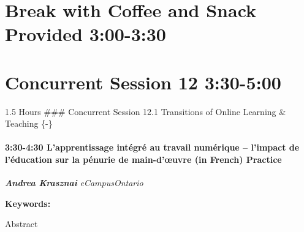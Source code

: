 \documentclass[
]{book}
\begin{document}
\hypertarget{break-with-coffee-and-snack-provided-300-330-1}{%
\section{Break with Coffee and Snack Provided \textbar{} 3:00-3:30}\label{break-with-coffee-and-snack-provided-300-330-1}}

\hypertarget{concurrent-session-12-330-500}{%
\section*{Concurrent Session 12 \textbar{} 3:30-5:00}\label{concurrent-session-12-330-500}}

1.5 Hours
\#\#\# Concurrent Session 12.1 \textbar{} Transitions of Online Learning \& Teaching \{-\}

\begin{session}
\hypertarget{lapprentissage-intuxe9gruxe9-au-travail-numuxe9rique-limpact-de-luxe9ducation-sur-la-puxe9nurie-de-main-dux153uvre-in-french-practice}{%
\paragraph*{\texorpdfstring{3:30-4:30 \textbar{} \textbf{L'apprentissage
intégré au travail numérique -- l'impact de l'éducation sur la pénurie
de main-d'œuvre (in French)} \textbar{}
Practice}{3:30-4:30 \textbar{} L'apprentissage intégré au travail numérique -- l'impact de l'éducation sur la pénurie de main-d'œuvre (in French) \textbar{} Practice}}\label{lapprentissage-intuxe9gruxe9-au-travail-numuxe9rique-limpact-de-luxe9ducation-sur-la-puxe9nurie-de-main-dux153uvre-in-french-practice}}

\textbf{\emph{Andrea Krasznai}} \textbar{} \emph{eCampusOntario}

\textbf{Keywords:}

Abstract
\end{session}
\end{document}
